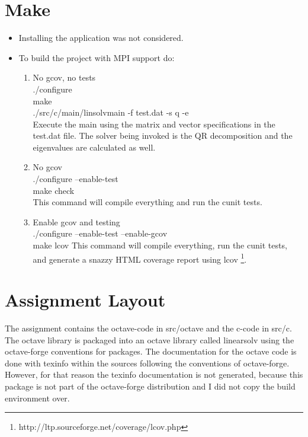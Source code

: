 \documentclass{article}
\begin{document}
\section{Make}
\label{sec:make}
\begin{itemize}
\item Installing the application was not considered.
\item To build the project with MPI support do:
  \begin{enumerate}
  \item No gcov, no tests\\
    ./configure \\
    make \\
    ./src/c/main/linsolvmain -f test.dat -s q -e \\
    Execute the main using the matrix and vector specifications in the
    test.dat file. The solver being invoked is the QR decomposition
    and the eigenvalues are calculated as well.
  \item No gcov\\
    ./configure --enable-test\\
    make check\\
    This command will compile everything and run the cunit tests.
  \item Enable gcov and testing\\
    ./configure --enable-test --enable-gcov\\
    make lcov This command will compile everything, run the cunit
    tests, and generate a snazzy HTML coverage report using lcov
    \footnote{http://ltp.sourceforge.net/coverage/lcov.php}.
  \end{enumerate}
\end{itemize}

\section{Assignment Layout}
\label{sec:assignment-layout}

The assignment contains the octave-code in src/octave and the c-code
in src/c. The octave library is packaged into an octave library called
linearsolv using the octave-forge conventions for packages. The
documentation for the octave code is done with texinfo within the
sources following the conventions of octave-forge. However, for that
reason the texinfo documentation is not generated, because this
package is not part of the octave-forge distribution and I did not
copy the build environment over.
\end{document}
